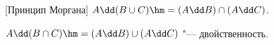 [Принцип Моргана]\label{PM} $A\dd(B\cup C)\hm=(A\dd B)\cap (A\dd C)$.


    $A\dd(B\cap C)\hm=(A\dd B)\cup (A\dd C)$ "--- двойственность.
